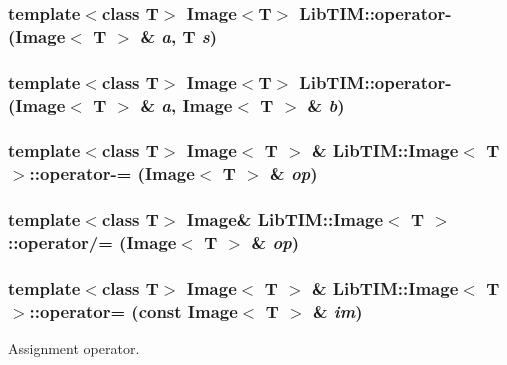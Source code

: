 \subsubsection{\setlength{\rightskip}{0pt plus 5cm}template$<$class T$>$ Image$<$T$>$ Lib\-TIM::operator- (Image$<$ T $>$ \& {\em a}, T {\em s})}\label{group__Image_ga75}


\subsubsection{\setlength{\rightskip}{0pt plus 5cm}template$<$class T$>$ Image$<$T$>$ Lib\-TIM::operator- (Image$<$ T $>$ \& {\em a}, Image$<$ T $>$ \& {\em b})}\label{group__Image_ga72}


\subsubsection{\setlength{\rightskip}{0pt plus 5cm}template$<$class T$>$ Image$<$ T $>$ \& {\bf Lib\-TIM::Image}$<$ T $>$::operator-= ({\bf Image}$<$ T $>$ \& {\em op})\hspace{0.3cm}{\tt  [inherited]}}\label{group__Image_ga48}


\subsubsection{\setlength{\rightskip}{0pt plus 5cm}template$<$class T$>$ Image\& {\bf Lib\-TIM::Image}$<$ T $>$::operator/= ({\bf Image}$<$ T $>$ \& {\em op})\hspace{0.3cm}{\tt  [inherited]}}\label{group__Image_ga50}


\subsubsection{\setlength{\rightskip}{0pt plus 5cm}template$<$class T$>$ Image$<$ T $>$ \& {\bf Lib\-TIM::Image}$<$ T $>$::operator= (const {\bf Image}$<$ T $>$ \& {\em im})\hspace{0.3cm}{\tt  [inherited]}}\label{group__Image_ga16}


Assignment operator. 

